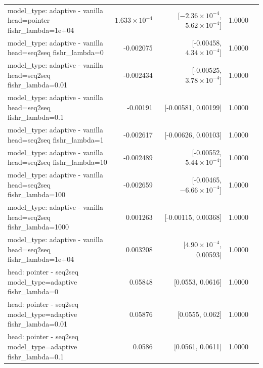 \documentclass[10pt]{article}
\makeatletter
\newcommand{\stackcell}[1]{\begin{tabular}[t]{@{}l@{}}#1\end{tabular}}
\makeatother
\begin{document}
{\begin{longtable}{lrrrl}
\stackcell{model\_type: adaptive - vanilla\\\footnotesize head=pointer fishr\_lambda=1e+04 } & $1.633\times10^{-4}$ & [$-2.36\times10^{-4}$, $5.62\times10^{-4}$] & 1.0000 & \\
\stackcell{model\_type: adaptive - vanilla\\\footnotesize head=seq2seq fishr\_lambda=0 } & -0.002075 & [-0.00458, $4.34\times10^{-4}$] & 1.0000 & \\
\stackcell{model\_type: adaptive - vanilla\\\footnotesize head=seq2seq fishr\_lambda=0.01 } & -0.002434 & [-0.00525, $3.78\times10^{-4}$] & 1.0000 & \\
\stackcell{model\_type: adaptive - vanilla\\\footnotesize head=seq2seq fishr\_lambda=0.1 } & -0.00191 & [-0.00581, 0.00199] & 1.0000 & \\
\stackcell{model\_type: adaptive - vanilla\\\footnotesize head=seq2seq fishr\_lambda=1 } & -0.002617 & [-0.00626, 0.00103] & 1.0000 & \\
\stackcell{model\_type: adaptive - vanilla\\\footnotesize head=seq2seq fishr\_lambda=10 } & -0.002489 & [-0.00552, $5.44\times10^{-4}$] & 1.0000 & \\
\stackcell{model\_type: adaptive - vanilla\\\footnotesize head=seq2seq fishr\_lambda=100 } & -0.002659 & [-0.00465, $-6.66\times10^{-4}$] & 1.0000 & \\
\stackcell{model\_type: adaptive - vanilla\\\footnotesize head=seq2seq fishr\_lambda=1000 } & 0.001263 & [-0.00115, 0.00368] & 1.0000 & \\
\stackcell{model\_type: adaptive - vanilla\\\footnotesize head=seq2seq fishr\_lambda=1e+04 } & 0.003208 & [$4.90\times10^{-4}$, 0.00593] & 1.0000 & \\
\stackcell{head: pointer - seq2seq\\\footnotesize model\_type=adaptive fishr\_lambda=0 } & 0.05848 & [0.0553, 0.0616] & 1.0000 & \\
\stackcell{head: pointer - seq2seq\\\footnotesize model\_type=adaptive fishr\_lambda=0.01 } & 0.05876 & [0.0555, 0.062] & 1.0000 & \\
\stackcell{head: pointer - seq2seq\\\footnotesize model\_type=adaptive fishr\_lambda=0.1 } & 0.0586 & [0.0561, 0.0611] & 1.0000 & \\

\end{longtable}}
\end{document}
